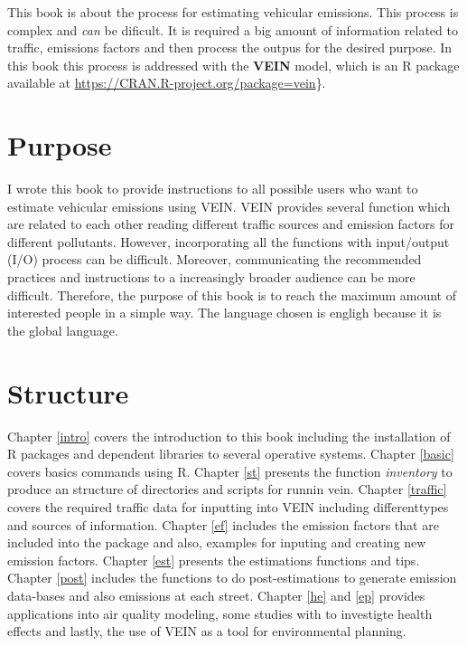 \documentclass[12pt,graybox,envcountchap,sectrefs]{krantz}
\theoremstyle{definition}
\theoremstyle{definition}
\theoremstyle{definition}
\theoremstyle{remark}
\begin{document}
This book is about the process for estimating vehicular emissions. This
process is complex and \emph{can} be dificult. It is required a big
amount of information related to traffic, emissions factors and then
process the outpus for the desired purpose. In this book this process is
addressed with the \textbf{VEIN} \citep{gmd-2017-193} model, which is an
R package available at \url{https://CRAN.R-project.org/package=vein}\}.

\section*{Purpose}\label{purpose}


I wrote this book to provide instructions to all possible users who want
to estimate vehicular emissions using VEIN. VEIN provides several
function which are related to each other reading different traffic
sources and emission factors for different pollutants. However,
incorporating all the functions with input/output (I/O) process can be
difficult. Moreover, communicating the recommended practices and
instructions to a increasingly broader audience can be more difficult.
Therefore, the purpose of this book is to reach the maximum amount of
interested people in a simple way. The language chosen is engligh
because it is the global language.

\section*{Structure}\label{structure}


Chapter \ref{intro} covers the introduction to this book including the
installation of R packages and dependent libraries to several operative
systems. Chapter \ref{basic} covers basics commands using R. Chapter
\ref{st} presents the function \emph{inventory} to produce an structure
of directories and scripts for runnin vein. Chapter \ref{traffic} covers
the required traffic data for inputting into VEIN including
differenttypes and sources of information. Chapter \ref{ef} includes the
emission factors that are included into the package and also, examples
for inputing and creating new emission factors. Chapter \ref{est}
presents the estimations functions and tips. Chapter \ref{post} includes
the functions to do post-estimations to generate emission data-bases and
also emissions at each street. Chapter \ref{he} and \ref{ep} provides
applications into air quality modeling, some studies with to investigte
health effects and lastly, the use of VEIN as a tool for environmental
planning.
\end{document}
